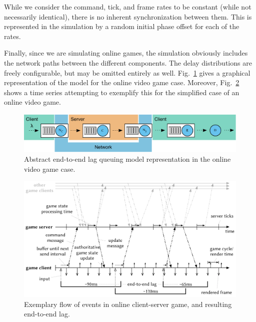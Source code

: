 While we consider the command, tick, and frame rates to be constant 
(while not necessarily identical), there is no inherent synchronization 
between them. This is represented in the simulation by a random initial 
phase offset for each of the rates.

Finally, since we are simulating online games, the simulation obviously 
includes the network paths between the different components. The delay 
distributions are freely configurable, but may be omitted entirely as well.
Fig.~\ref{fig:queuing-model} gives a graphical representation of the model for the online video game case. Moreover, Fig.~\ref{fig:tickrate-timeseries} shows a time series attempting to exemplify this for the simplified case of an online video game.

\begin{figure}[!t]
	\centering
	\includegraphics[width=1.0\textwidth]{../models/e2e-lag-model.pdf}
	\caption{Abstract end-to-end lag queuing model representation in the online video game case.}
\label{fig:queuing-model}
\end{figure}


\begin{figure}[!t]
	\centering
	\includegraphics[width=1.0\columnwidth]{../models/tickrate-timeseries.pdf}
	\caption{Exemplary flow of events in online client-server game, and resulting end-to-end lag.} %
\label{fig:tickrate-timeseries}
\end{figure}





